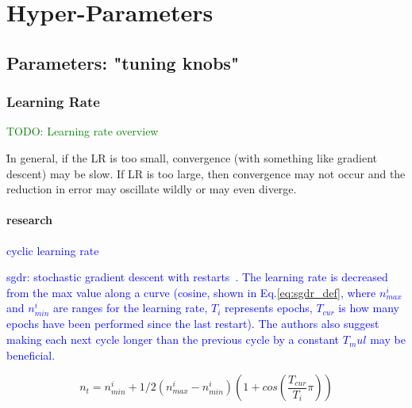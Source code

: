 \section{Hyper-Parameters}

\subsection{Parameters: "tuning knobs"}

\subsubsection{Learning Rate}

\textcolor{green}{TODO: Learning rate overview}




\r{In general, if the LR is too small, convergence (with something like gradient descent) may be slow.  If LR is too large, then convergence may not occur and the reduction in error may oscillate wildly or may even diverge.}

\paragraph{research}


\textcolor{blue}{cyclic learning rate~\cite{smith2017cyclical}}

\textcolor{blue}{sgdr: stochastic gradient descent with restarts~\cite{loshchilov2016sgdr}. The learning rate is decreased from the max value along a curve (cosine, shown in Eq.\ref{eq:sgdr_def}, where $n_{max}^i$ and $n_{min}^i$ are ranges for the learning rate, $T_i$ represents epochs, $T_{cur}$ is how many epochs have been performed since the last restart). The authors also suggest making each next cycle longer than the previous cycle by a constant $T_mul$ may be beneficial.}

\begin{equation}
{n_t = n_{min}^i + 1/2(n_{max}^i - n_{min}^i)(1 + cos(\frac{T_{cur}}{T_i}\pi))}
\label{eq:sgdr_def}
\end{equation}

